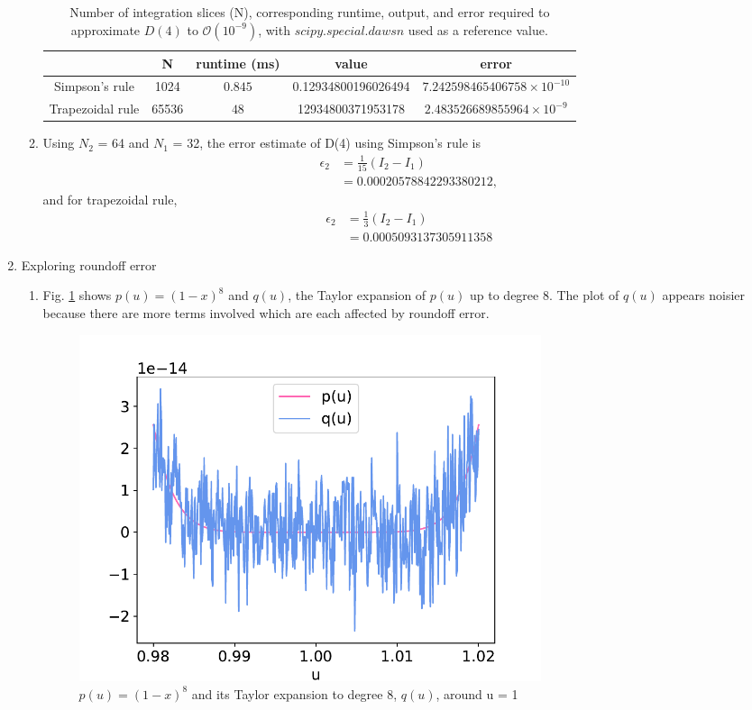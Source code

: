 \documentclass{article}
\begin{document}
\begin{enumerate}
\begin{enumerate}
    \begin{table}[H]
        \centering
        \begin{tabular}{c|c|c|c|c}
            \centering
            & N & runtime (ms) & value & error \\\hline 
            Simpson's rule & 1024 & $0.845$ & 0.12934800196026494 & $7.242598465406758\times 10^{-10}$\\\hline
            Trapezoidal rule & 65536 & $48$ & 12934800371953178 & $2.483526689855964\times 10^{-9}$ \\ 
        \end{tabular}
    \captionsetup{width=0.9\textwidth}
    \caption{Number of integration slices (N), corresponding runtime, output, and error required to approximate $D(4)$ to $\mathcal{O}(10^{-9})$, with $scipy.special.dawsn$ used as a reference value.}
    \label{tab:2b}
    \end{table}

    \item Using $N_2$ = 64 and $N_1$ = 32, the error estimate of D(4) using Simpson's rule is 
        \begin{align*}
            \epsilon_2& = \frac{1}{15}(I_2-I_1) \\
            &= 0.00020578842293380212,
        \end{align*}
    and for trapezoidal rule, 
        \begin{align*}
            \epsilon_2 &= \frac{1}{3}(I_2-I_1) \\
            &= 0.0005093137305911358
        \end{align*}
\end{enumerate}

\item Exploring roundoff error
\begin{enumerate}
    \item Fig. \ref{fig:3a} shows $p(u)=(1-x)^8$ and $q(u)$, the Taylor expansion of $p(u)$ up to degree 8. The plot of $q(u)$ appears noisier because there are more terms involved which are each affected by roundoff error.
    \begin{figure}[h]
        \centering
        \includegraphics[width=0.7\textwidth]{3a.pdf}
        \caption{$p(u) = (1-x)^8$ and its Taylor expansion to degree 8, $q(u)$, around u = 1}
        \label{fig:3a}
    \end{figure} 


\end{enumerate}
\end{enumerate}
\end{document}
